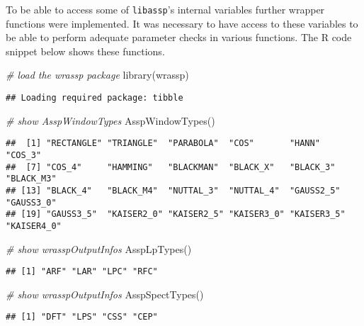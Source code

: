 \documentclass[
]{book}
\newenvironment{Shaded}{\begin{snugshade}}{\end{snugshade}}
\newcommand{\CommentTok}[1]{\textcolor[rgb]{0.56,0.35,0.01}{\textit{#1}}}
\newcommand{\FunctionTok}[1]{\textcolor[rgb]{0.00,0.00,0.00}{#1}}
\newcommand{\NormalTok}[1]{#1}
\begin{document}
To be able to access some of \texttt{libassp}'s internal variables further wrapper functions were implemented. It was necessary to have access to these variables to be able to perform adequate parameter checks in various functions. The R code snippet below shows these functions.

\begin{Shaded}
\begin{Highlighting}[]
\CommentTok{\# load the wrassp package}
\FunctionTok{library}\NormalTok{(wrassp)}
\end{Highlighting}
\end{Shaded}

\begin{verbatim}
## Loading required package: tibble
\end{verbatim}

\begin{Shaded}
\begin{Highlighting}[]
\CommentTok{\# show AsspWindowTypes}
\FunctionTok{AsspWindowTypes}\NormalTok{()}
\end{Highlighting}
\end{Shaded}

\begin{verbatim}
##  [1] "RECTANGLE" "TRIANGLE"  "PARABOLA"  "COS"       "HANN"      "COS_3"    
##  [7] "COS_4"     "HAMMING"   "BLACKMAN"  "BLACK_X"   "BLACK_3"   "BLACK_M3" 
## [13] "BLACK_4"   "BLACK_M4"  "NUTTAL_3"  "NUTTAL_4"  "GAUSS2_5"  "GAUSS3_0" 
## [19] "GAUSS3_5"  "KAISER2_0" "KAISER2_5" "KAISER3_0" "KAISER3_5" "KAISER4_0"
\end{verbatim}

\begin{Shaded}
\begin{Highlighting}[]
\CommentTok{\# show wrasspOutputInfos}
\FunctionTok{AsspLpTypes}\NormalTok{()}
\end{Highlighting}
\end{Shaded}

\begin{verbatim}
## [1] "ARF" "LAR" "LPC" "RFC"
\end{verbatim}

\begin{Shaded}
\begin{Highlighting}[]
\CommentTok{\# show wrasspOutputInfos}
\FunctionTok{AsspSpectTypes}\NormalTok{()}
\end{Highlighting}
\end{Shaded}

\begin{verbatim}
## [1] "DFT" "LPS" "CSS" "CEP"
\end{verbatim}
\end{document}

